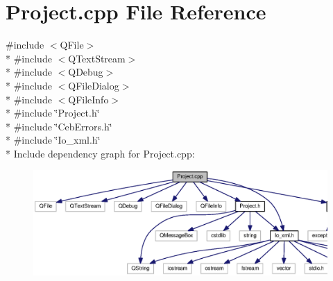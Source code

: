 \section{Project.\-cpp File Reference}
\label{_project_8cpp}
{\ttfamily \#include $<$Q\-File$>$}\\*
{\ttfamily \#include $<$Q\-Text\-Stream$>$}\\*
{\ttfamily \#include $<$Q\-Debug$>$}\\*
{\ttfamily \#include $<$Q\-File\-Dialog$>$}\\*
{\ttfamily \#include $<$Q\-File\-Info$>$}\\*
{\ttfamily \#include \char`\"{}Project.\-h\char`\"{}}\\*
{\ttfamily \#include \char`\"{}Ceb\-Errors.\-h\char`\"{}}\\*
{\ttfamily \#include \char`\"{}Io\-\_\-xml.\-h\char`\"{}}\\*
Include dependency graph for Project.\-cpp\-:\nopagebreak
\begin{figure}[H]
\begin{center}
\leavevmode
\includegraphics[width=350pt]{_project_8cpp__incl}
\end{center}
\end{figure}
